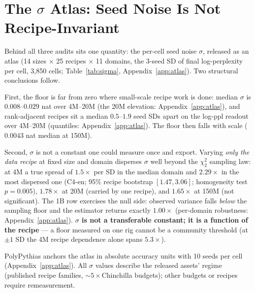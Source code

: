 
\section{The $\sigma$ Atlas: Seed Noise Is Not Recipe-Invariant}
\label{sec:atlas}

Behind all three audits sits one quantity: the per-cell seed noise $\sigma$, released as an
atlas (14 sizes $\times$ 25 recipes $\times$ 11 domains, the 3-seed SD of final log-perplexity
per cell, 3{,}850 cells; Table~\ref{tab:sigma}, Appendix~\ref{app:atlas}). Two
structural conclusions follow.

First, the floor is far from zero where small-scale recipe work is done: median $\sigma$ is
$0.008$--$0.029$ nat over 4M--20M (the 20M elevation: Appendix~\ref{app:atlas}), and rank-adjacent recipes sit a median $0.5$--$1.9$ seed SDs apart on the log-ppl readout over 4M--20M (quantiles: Appendix~\ref{app:atlas}). The
floor then falls with scale ($0.0043$ nat median at 150M).

Second, $\sigma$ is not a constant one could measure once and export. Varying \emph{only the
data recipe} at fixed size and domain disperses $\sigma$ well beyond the $\chi^2_2$ sampling
law: at 4M a true spread of $1.5\times$ per SD in the median domain
and $2.29\times$ in the most dispersed one (C4-en; 95\% recipe bootstrap $[1.47, 3.06]$;
homogeneity test $p = 0.005$), $1.78\times$ at 20M
(carried by one recipe), and $1.65\times$ at 150M (not significant). The 1B row exercises the
null side: observed variance falls \emph{below} the sampling floor and the estimator
returns exactly $1.00\times$ (per-domain robustness: Appendix~\ref{app:atlas}).
\textbf{$\sigma$ is not a transferable constant; it is a function of the recipe} --- a floor
measured on one rig cannot be a community threshold (at $\pm 1$ SD the 4M recipe dependence
alone spans $5.3\times$).

PolyPythias anchors the atlas in absolute accuracy units with 10 seeds per cell
(Appendix~\ref{app:atlas}).
All $\sigma$ values describe the released assets' regime (published recipe families,
${\sim}5\times$Chinchilla budgets); other budgets or recipes require remeasurement.
